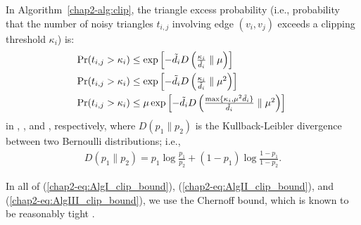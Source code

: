 \begin{theorem}\label{chap2-thm:triangle_excess}
In Algorithm~\ref{chap2-alg:clip}, the triangle excess probability (i.e., probability that the number of noisy triangles $t_{i,j}$ involving edge $(v_i, v_j)$ exceeds a clipping threshold $\kappa_i$) is:
  \begin{align}
    \hspace{-1mm} \Pr(t_{i,j} > \kappa_i) &\leq \textstyle{\exp \left[-\tilde{d}_i D \left(\frac{\kappa_i}{\tilde{d}_i} \parallel \mu \right) \right]} \label{chap2-eq:AlgI_clip_bound} \\
    \hspace{-1mm} \Pr(t_{i,j} > \kappa_i) &\leq \textstyle{\exp \left[-\tilde{d}_i D \left(\frac{\kappa_i}{\tilde{d}_i} \parallel \mu^2 \right) \right]} \label{chap2-eq:AlgII_clip_bound}\\
    \hspace{-1mm} \Pr(t_{i,j} > \kappa_i) &\leq 
    \textstyle{\mu \exp \left[-\tilde{d}_i D \left(\frac{\max\{\kappa_i,\mu^2 \tilde{d}_i\}}{\tilde{d}_i} \parallel \mu^2 \right) \right]}
    \label{chap2-eq:AlgIII_clip_bound}
  \end{align}
  in \AlgOne{}, \AlgTwo{}, and \AlgThree{}, respectively, 
  where 
  $D(p_1 \parallel p_2)$ is the Kullback-Leibler divergence between two Bernoulli distributions; i.e., 
\begin{align*}
    \textstyle{D(p_1 \parallel p_2) = p_1 \log \frac{p_1}{p_2} + (1-p_1) \log \frac{1-p_1}{1-p_2}.}
\end{align*}
\end{theorem}
In all of (\ref{chap2-eq:AlgI_clip_bound}), (\ref{chap2-eq:AlgII_clip_bound}), and (\ref{chap2-eq:AlgIII_clip_bound}), we use the Chernoff bound, which is known to be reasonably tight \cite{Arratia_BMB89}. 

